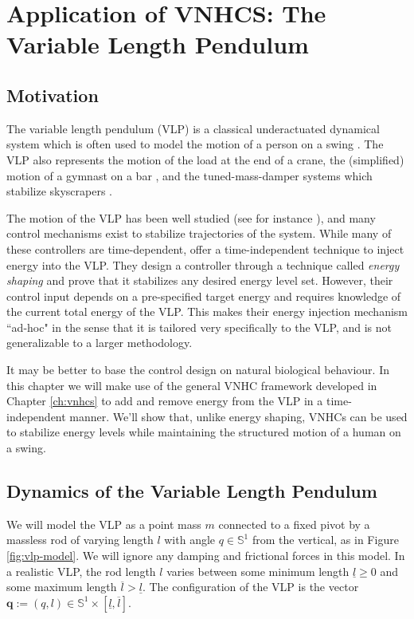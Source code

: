 
\chapter{Application of VNHCS: The Variable Length Pendulum}\label{ch:vlp}
\section{Motivation}
The variable length pendulum (VLP) is a classical underactuated dynamical system
which is often used to model the motion of a person on a swing
\cite{pumping_swing_standing_squatting,how_to_pump_a_swing}.
The VLP also represents the motion of the load at the end of a crane, 
the (simplified) motion of a gymnast on a bar
\cite{pendulum_length_giant_gymnastics}, and the tuned-mass-damper systems which
stabilize skyscrapers \cite{vlp_tuned_mass_damper}.

The motion of the VLP has been well studied (see for instance
\cite{dynamics_periodic_vlp}), and many control mechanisms exist
to stabilize trajectories of the system. While many of these controllers 
are time-dependent, \citet{vlp_energy_shaping}
offer a time-independent technique to inject energy into the VLP. 
They design a controller through a technique called \textit{energy shaping}
and prove that it stabilizes any desired energy level set.
However, their control input depends on a pre-specified target energy and requires
knowledge of the current total energy of the VLP.
This makes their energy injection mechanism ``ad-hoc" in the sense that it is
tailored very specifically to the VLP, and is not generalizable to a larger 
methodology.

It may be better to base the control design on natural biological behaviour.
In this chapter we will make use of the general VNHC framework developed in Chapter
\ref{ch:vnhcs} to add and remove energy from the VLP in a time-independent
manner.
We'll show that, unlike energy shaping, VNHCs can be used to stabilize energy
levels while maintaining the structured motion of a human on a swing.

\section{Dynamics of the Variable Length Pendulum}
We will model the VLP as a point mass \(m\)
connected to a fixed pivot by a massless rod of varying length \(l\) with angle 
\(q \in \mathbb{S}^1\) from the vertical, as in Figure
\ref{fig:vlp-model}. 
We will ignore any damping and frictional forces in this model.
In a realistic VLP, the rod length \(l\) varies between some minimum
length \(\underline{l} \geq 0\) and some maximum length 
\(\overline{l} > \underline{l}\). The configuration of the VLP is the vector
\(\mathbf{q} := (q,l) \in \mathbb{S}^1 \times [\underline{l},\overline{l}]\).

